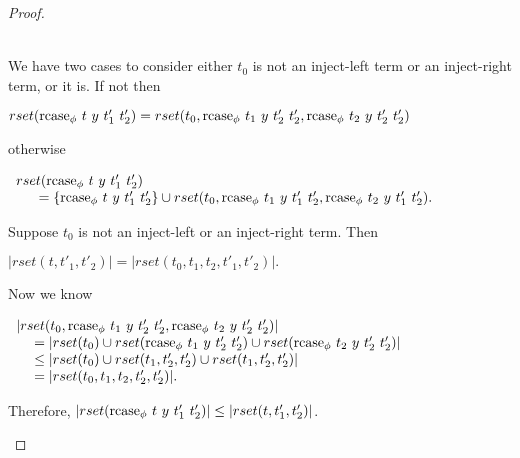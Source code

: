 \begin{proof}
\begin{itemize}
\begin{itemize}
    \ \\
    We have two cases to consider either $t_0$ is not an inject-left term or an inject-right term, or it is.
    If not then
    \begin{center}
      \begin{math}
        rset(\mbox{rcase}_{\phi}\ t\ y\ t'_1\ t'_2) =
        rset(t_0,\mbox{rcase}_{\phi}\ t_1\ y\ t'_2\ t'_2,\mbox{rcase}_{\phi}\ t_2\ y\ t'_2\ t'_2) 
      \end{math}
    \end{center}
    otherwise 
    \begin{center}
      \begin{math}
        \begin{array}{lll}
          rset(\mbox{rcase}_{\phi}\ t\ y\ t'_1\ t'_2) \\
          \text{\ \ \ \ } = \{\mbox{rcase}_{\phi}\ t\ y\ t'_1\ t'_2\} \cup
          rset(t_0,\mbox{rcase}_{\phi}\ t_1\ y\ t'_1\ t'_2,\mbox{rcase}_{\phi}\ t_2\ y\ t'_1\ t'_2).
        \end{array}
      \end{math}
    \end{center}
    Suppose $t_0$ is not an inject-left or an inject-right term.  Then
    \begin{center}
      \begin{math}
        |rset(t, t'_1, t'_2)| = |rset(t_0, t_1, t_2, t'_1, t'_2)|.
      \end{math}
    \end{center}
    Now we know 
    \begin{center}
      \begin{math}
        \begin{array}{ll}
          |rset(t_0,\mbox{rcase}_{\phi}\ t_1\ y\ t'_2\ t'_2,\mbox{rcase}_{\phi}\ t_2\ y\ t'_2\ t'_2)|\\
          \text{\ \ \ } = 
          |rset(t_0) \cup rset(\mbox{rcase}_{\phi}\ t_1\ y\ t'_2\ t'_2) \cup rset(\mbox{rcase}_{\phi}\ t_2\ y\ t'_2\ t'_2)|\\
          \text{\ \ \ } \leq  |rset(t_0) \cup rset(t_1,t'_2,t'_2) \cup rset(t_1,t'_2,t'_2)| \\
          \text{\ \ \ } =   |rset(t_0, t_1,t_2,t'_2,t'_2)|.
        \end{array}
      \end{math}
    \end{center}
    Therefore, $|rset(\mbox{rcase}_{\phi}\ t\ y\ t'_1\ t'_2)| \leq |rset(t, t'_1, t'_2)|$.
    

\end{itemize}
\end{itemize}
\end{proof}
